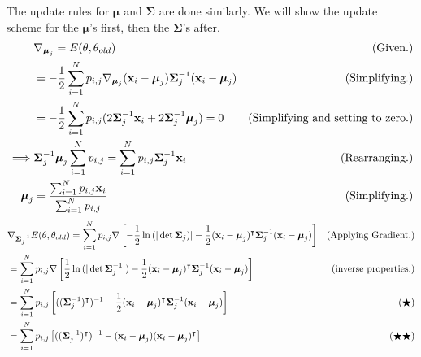 \begin{solution}

    The update rules for $\boldsymbol{\mu}$ and $\boldsymbol{\Sigma}$ are done similarly. We will show the update scheme for the $\boldsymbol{\mu}$'s first, then the $\boldsymbol{\Sigma}$'s after. 
    \tightalignbreak\vspace{-2mm}
    \begin{align*}
        &\nabla_{\boldsymbol{\mu}_j} = E(\theta, \theta_{old}) &\text{(Given.)}\\
        &= -\frac{1}{2}\sum_{i = 1}^N p_{i, j} \nabla_{\boldsymbol{\mu}_j}(\textbf{x}_i - \boldsymbol{\mu}_j) \boldsymbol{\Sigma}^{-1}_j (\textbf{x}_i - \boldsymbol{\mu}_j) &\text{(Simplifying.)}\\
        &= -\frac{1}{2}\sum_{i = 1}^N p_{i, j} (2\boldsymbol{\Sigma}^{-1}_j \textbf{x}_i + 2\boldsymbol{\Sigma}^{-1}_j \boldsymbol{\mu}_j) = 0 &\text{(Simplifying and setting to zero.)}\\
        \implies & \boldsymbol{\Sigma}^{-1}_j\boldsymbol{\mu}_j\sum_{i = 1}^Np_{i, j} = \sum_{i = 1}^N p_{i, j}\boldsymbol{\Sigma}^{-1}_j \textbf{x}_i &\text{(Rearranging.)}\\
        \boldsymbol{\mu}_j &= \frac{\sum_{i = 1}^N{p_{i, j}\textbf{x}_i}}{\sum_{i = 1}^N{p_{i, j}}} &\text{(Simplifying.)}
    \end{align*}
    \vspace{-12mm}\alignbreak\vspace{-6mm}
    \begin{align*}
        &\grad_{\boldsymbol{\Sigma}\inv_j} E(\theta, \theta_{old}) = \sum_{i = 1}^N p_{i, j} \grad \left[ -\frac{1}{2} \ln{(|\det \boldsymbol{\Sigma}_j)|}  - \frac{1}{2}(\textbf{x}_i - \boldsymbol{\mu}_j)\T \boldsymbol{\Sigma}\inv_j (\textbf{x}_i - \boldsymbol{\mu}_j)\right] &\text{(Applying Gradient.)}\\
        &= \sum_{i = 1}^N p_{i, j} \grad \left[ \frac{1}{2} \ln{(|\det \boldsymbol{\Sigma}\inv_j|)}  - \frac{1}{2}(\textbf{x}_i - \boldsymbol{\mu}_j)\T \boldsymbol{\Sigma}\inv_j (\textbf{x}_i - \boldsymbol{\mu}_j)\right] &\text{(inverse properties.)}\\
        &= \sum_{i = 1}^N p_{i, j} \left[ ((\boldsymbol{\Sigma}\inv_j)\T)\inv - \frac{1}{2}(\textbf{x}_i - \boldsymbol{\mu}_j)\T \boldsymbol{\Sigma}\inv_j (\textbf{x}_i - \boldsymbol{\mu}_j)\right] &(\bigstar)\\
        &= \sum_{i = 1}^N p_{i, j} \left[ ((\boldsymbol{\Sigma}\inv_j)\T)\inv - (\textbf{x}_i - \boldsymbol{\mu}_j) (\textbf{x}_i - \boldsymbol{\mu}_j)\T \right] &(\bigstar \bigstar)\\

\end{align*}
\end{solution}
